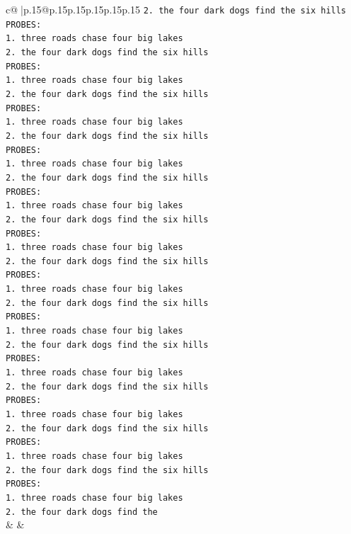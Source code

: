 \documentclass{article}
\begin{document}
{\begin{supertabular}{c@{$\;$}|p{.15\linewidth}@{}p{.15\linewidth}p{.15\linewidth}p{.15\linewidth}p{.15\linewidth}p{.15\linewidth}}
{{{\texttt{2. the four dark dogs find the six hills} \\
\texttt{PROBES:} \\
\texttt{1. three roads chase four big lakes} \\
\texttt{2. the four dark dogs find the six hills} \\
\texttt{PROBES:} \\
\texttt{1. three roads chase four big lakes} \\
\texttt{2. the four dark dogs find the six hills} \\
\texttt{PROBES:} \\
\texttt{1. three roads chase four big lakes} \\
\texttt{2. the four dark dogs find the six hills} \\
\texttt{PROBES:} \\
\texttt{1. three roads chase four big lakes} \\
\texttt{2. the four dark dogs find the six hills} \\
\texttt{PROBES:} \\
\texttt{1. three roads chase four big lakes} \\
\texttt{2. the four dark dogs find the six hills} \\
\texttt{PROBES:} \\
\texttt{1. three roads chase four big lakes} \\
\texttt{2. the four dark dogs find the six hills} \\
\texttt{PROBES:} \\
\texttt{1. three roads chase four big lakes} \\
\texttt{2. the four dark dogs find the six hills} \\
\texttt{PROBES:} \\
\texttt{1. three roads chase four big lakes} \\
\texttt{2. the four dark dogs find the six hills} \\
\texttt{PROBES:} \\
\texttt{1. three roads chase four big lakes} \\
\texttt{2. the four dark dogs find the six hills} \\
\texttt{PROBES:} \\
\texttt{1. three roads chase four big lakes} \\
\texttt{2. the four dark dogs find the six hills} \\
\texttt{PROBES:} \\
\texttt{1. three roads chase four big lakes} \\
\texttt{2. the four dark dogs find the six hills} \\
\texttt{PROBES:} \\
\texttt{1. three roads chase four big lakes} \\
\texttt{2. the four dark dogs find the} \\
            }
        }
    }
    & & \\ \\


\end{supertabular}}
\end{document}
